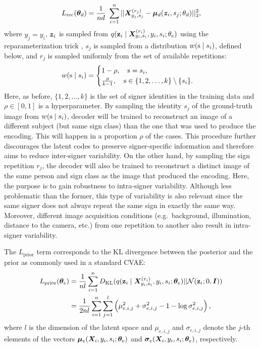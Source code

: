 \begin{equation}
    \label{eq:loss_rec}
    L_{\text{rec}}({\bm{\theta}}_{d}) = \frac{1}{n d}~\sum_{i=1}^{n}||{\bm{X}}^{(r_{j})}_{y_{j},s_{j}}-{\bm{\mu}}_d({\bm{z}}_{i},s_{j}; \theta_{d})||^2_2,
\end{equation}
where $y_{j}=y_{i}$, ${\bm{z}}_{i}$ is sampled from $q({\mathbf{z}}_{i} \mid {\bm{X}}^{(r_{i})}_{y_{i},s_{i}}, y_{i}, s_{i}; \theta_e)$ using the reparameterization trick , $s_{j}$ is sampled from a distribution $w({\textnormal{s}} \mid s_{i})$, defined below, and $r_{j}$ is sampled uniformly from the set of available repetitions:
\begin{equation}
    w({\textnormal{s}} \mid s_{i}) =
    \begin{cases}
        1-\rho, \quad {\textnormal{s}}=s_{i}, \\
        \frac{\rho}{k-1}, \quad {\textnormal{s}} \in \{1,2,\dots,k\} \setminus \lbrace s_{i} \rbrace.
    \end{cases}
\end{equation}
Here, as before, $\{1,2,\dots,k\}$ is the set of signer identities in the training data and $\rho \in [0, 1]$ is a hyperparameter. By sampling the identity $s_{j}$ of the ground-truth image from $w({\textnormal{s}} \mid s_{i})$, decoder will be trained to reconstruct an image of a different subject (but same sign class) than the one that was used to produce the encoding. This will happen in a proportion $\rho$ of the cases. This procedure further discourages the latent codes to preserve signer-specific information and therefore aims to reduce inter-signer variability. On the other hand, by sampling the sign repetition $r_{j}$, the decoder will also be trained to reconstruct a distinct image of the same person and sign class as the image that produced the encoding. Here, the purpose is to gain robustness to intra-signer variability. Although less problematic than the former, this type of variability is also relevant since the same signer does not always repeat the same sign in exactly the same way. Moreover, different image acquisition conditions (e.g.\ background, illumination, distance to the camera, etc.) from one repetition to another also result in intra-signer variability.

The $L_{\text{prior}}$ term corresponds to the KL divergence between the posterior and the prior as commonly used in a standard CVAE:
\begin{align}
    \label{eq:loss_prior}
    L_{\text{prior}}({\bm{\theta}}_{e}) &= \frac{1}{nl} \sum_{i=1}^n D_{\mathrm{KL}}(q({\mathbf{z}}_{i} \mid {\bm{X}}^{(r_{i})}_{y_{i},s_{i}}, y_{i}, s_{i}; {\bm{\theta}}_e) || {\mathcal{N}}({\mathbf{z}}_{i}; 0, {\bm{I}})) \nonumber\\
    &= \frac{1}{2nl} \sum_{i=1}^n \sum_{j=1}^l \left(\mu_{e,i,j}^2 + \sigma_{e,i,j}^2 -1 - \log \sigma_{e,i,j}^2\right),
\end{align}
where $l$ is the dimension of the latent space and $\mu_{e,i,j}$ and $\sigma_{e,i,j}$ denote the $j$-th elements of the vectors ${\bm{\mu}}_{e}({\bm{X}}_i, y_i, s_i; {\bm{\theta}}_e)$ and ${\bm{\sigma}}_{e}({\bm{X}}_i, y_i, s_i; {\bm{\theta}}_e)$, respectively.

